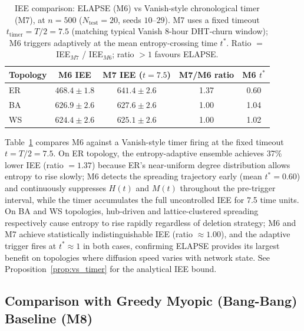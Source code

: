 \documentclass[review,12pt]{elsarticle}
\begin{document}
\begin{table}[htbp]
  \caption{IEE comparison: ELAPSE (M6) vs Vanish-style chronological timer (M7),
           at $n=500$ ($N_{\mathrm{test}}=20$, seeds $10$--$29$).
           M7 uses a fixed timeout $t_{\mathrm{timer}} = T/2 = 7.5$ (matching
           typical Vanish 8-hour DHT-churn window); M6 triggers adaptively
           at the mean entropy-crossing time $t^*$.
           Ratio $=$ IEE$_{M7}$ / IEE$_{M6}$; ratio $>1$ favours ELAPSE.}
  \label{tab:m7}
  \centering
  \small
  \renewcommand{\arraystretch}{1.2}
  \begin{tabular}{lcccc}
    \toprule
    Topology & M6 IEE & M7 IEE ($t{=}7.5$) & M7/M6 ratio & M6 $t^*$ \\
    \midrule
    ER & $468.4\pm 1.8$ & $641.4\pm 2.6$ & 1.37 & 0.60 \\
    BA & $626.9\pm 2.6$ & $627.6\pm 2.6$ & 1.00 & 1.04 \\
    WS & $624.4\pm 2.6$ & $625.1\pm 2.6$ & 1.00 & 1.02 \\
    \bottomrule
  \end{tabular}
\end{table}

\noindent
Table~\ref{tab:m7} compares M6 against a Vanish-style timer firing at the
fixed timeout $t = T/2 = 7.5$.  On ER topology, the entropy-adaptive ensemble
achieves 37\% lower IEE (ratio $=1.37$) because ER's near-uniform degree
distribution allows entropy to rise slowly; M6 detects the spreading trajectory
early (mean $t^* = 0.60$) and continuously suppresses $H(t)$ and $M(t)$
throughout the pre-trigger interval, while the timer accumulates the full
uncontrolled IEE for 7.5 time units.  On BA and WS topologies, hub-driven
and lattice-clustered spreading respectively cause entropy to rise rapidly
regardless of deletion strategy; M6 and M7 achieve statistically
indistinguishable IEE (ratio $\approx 1.00$), and the adaptive trigger fires
at $t^* \approx 1$ in both cases, confirming ELAPSE provides its largest
benefit on topologies where diffusion speed varies with network state.
See Proposition~\ref{prop:vs_timer} for the analytical IEE bound.

\subsection{Comparison with Greedy Myopic (Bang-Bang) Baseline (M8)}
\label{sec:greedy}
\end{document}
